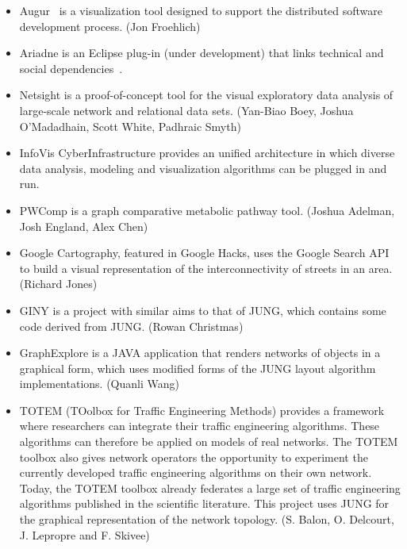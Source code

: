 \begin{enumerate}
\begin{itemize}
\item Augur~\cite{AUGUR} is a visualization tool designed to support the distributed software development process. (Jon Froehlich)~\cite{AUGUR_2}

\item Ariadne is an Eclipse plug-in (under development) that links technical and social dependencies~\cite{ARIADNE}.

\item Netsight is a proof-of-concept tool for the visual exploratory data analysis of large-scale network and relational data sets. (Yan-Biao Boey, Joshua O'Madadhain, Scott White, Padhraic Smyth)~\cite{NETSIGHT}

\item InfoVis CyberInfrastructure provides an unified architecture in which diverse data analysis, modeling and visualization algorithms can be plugged in and run.~\cite{INFOVIS_CYBERINFRASTRUCTURE}

\item PWComp is a graph comparative metabolic pathway tool. (Joshua Adelman, Josh England, Alex Chen)~\cite{PWCOMP}

\item Google Cartography, featured in Google Hacks, uses the Google Search API to build a visual representation of the interconnectivity of streets in an area. (Richard Jones)~\cite{GOOGLE_CARTOGRAPHY}

\item GINY is a project with similar aims to that of JUNG, which contains some code derived from JUNG. (Rowan Christmas)~\cite{GINY}

\item GraphExplore is a JAVA application that renders networks of objects in a graphical form, which uses modified forms of the JUNG layout algorithm implementations. (Quanli Wang)~\cite{GRAPHEXPLORER}

\item TOTEM (TOolbox for Traffic Engineering Methods) provides a framework where researchers can integrate their traffic engineering algorithms. These algorithms can therefore be applied on models of real networks. The TOTEM toolbox also gives network operators the opportunity to experiment the currently developed traffic engineering algorithms on their own network. Today, the TOTEM toolbox already federates a large set of traffic engineering algorithms published in the scientific literature. This project uses JUNG for the graphical representation of the network topology. (S. Balon, O. Delcourt, J. Lepropre and F. Skivee)~\cite{TOTEM}


\end{itemize}
\end{enumerate}
